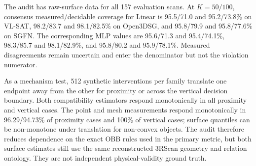 The audit has raw-surface data for all 157 evaluation scans. At $K=50/100$,
consensus measured/decidable coverage for Linear is 95.5/71.0 and 95.2/73.8\%
on VL-SAT, 98.2/83.7 and 98.1/82.5\% on Open3DSG, and 95.8/79.9 and
95.8/77.6\% on SGFN. The corresponding MLP values are 95.6/71.3 and
95.4/74.1\%, 98.3/85.7 and 98.1/82.9\%, and 95.8/80.2 and 95.9/78.1\%.
Measured disagreements remain uncertain and enter the denominator but not the
violation numerator.

As a mechanism test, 512 synthetic interventions per family translate one
endpoint away from the other for proximity or across the vertical decision
boundary. Both compatibility estimators respond monotonically in all proximity
and vertical cases. The point and mesh measurements respond monotonically in 96.29/94.73\%
of proximity cases and 100\% of vertical cases; surface quantiles can be
non-monotone under translation for non-convex objects. The audit therefore
reduces dependence on the exact OBB rules used in the primary metric, but both
surface estimates still use the same reconstructed 3RScan geometry and
relation ontology. They are not independent physical-validity ground truth.
